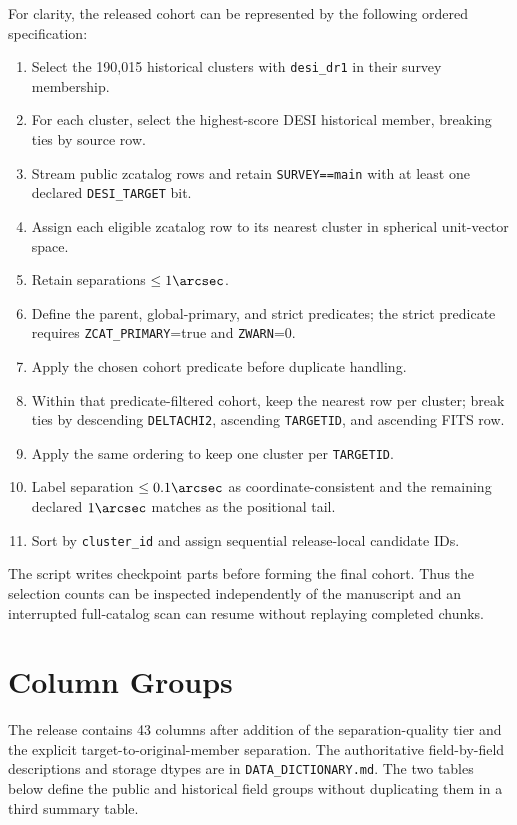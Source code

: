 \documentclass[twocolumn]{aastex701}
\begin{document}
For clarity, the released cohort can be represented by the following ordered specification:
\begin{enumerate}
\item Select the 190,015 historical clusters with \texttt{desi\_dr1} in their survey membership.
\item For each cluster, select the highest-score DESI historical member, breaking ties by source row.
\item Stream public zcatalog rows and retain
\texttt{SURVEY==main} with at least one declared \texttt{DESI\_TARGET} bit.
\item Assign each eligible zcatalog row to its nearest cluster in spherical unit-vector space.
\item Retain separations $\le1\arcsec$.
\item Define the parent, global-primary, and strict predicates; the strict predicate requires
\texttt{ZCAT\_PRIMARY}=true and \texttt{ZWARN}=0.
\item Apply the chosen cohort predicate before duplicate handling.
\item Within that predicate-filtered cohort, keep the nearest row per cluster; break ties by descending
\texttt{DELTACHI2}, ascending \texttt{TARGETID}, and ascending FITS row.
\item Apply the same ordering to keep one cluster per \texttt{TARGETID}.
\item Label separation $\le0.1\arcsec$ as coordinate-consistent and the remaining declared
$1\arcsec$ matches as the positional tail.
\item Sort by \texttt{cluster\_id} and assign sequential release-local candidate IDs.
\end{enumerate}

The script writes checkpoint parts before forming the final cohort.  Thus the selection counts
can be inspected independently of the manuscript and an interrupted full-catalog scan can resume
without replaying completed chunks.

\section{Column Groups}\label{app:columns}

The release contains 43 columns after addition of the separation-quality tier and the explicit
target-to-original-member separation.  The authoritative
field-by-field descriptions and storage dtypes are in \texttt{DATA\_DICTIONARY.md}.  The two
tables below define the public and historical field groups without duplicating them in a third
summary table.
\end{document}
